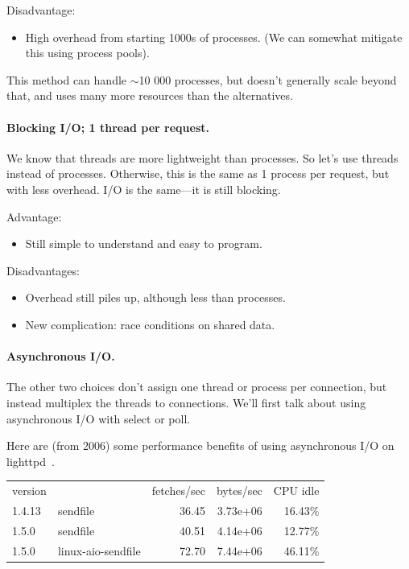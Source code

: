 \documentclass[a4paper]{report}
\begin{document}
Disadvantage:
  \begin{itemize}
    \item High overhead from starting 1000s of processes.
      (We can somewhat mitigate this using process pools).
  \end{itemize}
This method can handle $\sim$10 000 processes, but doesn't generally scale beyond that, and
uses many more resources than the alternatives.

\paragraph{Blocking I/O; 1 thread per request.}
    We know that threads are more lightweight than processes. So let's use threads instead
of processes. Otherwise, this is the same as 1 process per request, but with less overhead.
I/O is the same---it is still blocking.

    Advantage:
    \begin{itemize}
      \item Still simple to understand and easy to program.
    \end{itemize}

    Disadvantages:
    \begin{itemize}
      \item Overhead still piles up, although less than processes.
      \item New complication: race conditions on shared data.
    \end{itemize}

\paragraph{Asynchronous I/O.} The other two choices don't assign one thread or process per connection,
but instead multiplex the threads to connections. We'll first talk
about using asynchronous I/O with select or poll.  

Here are (from 2006) some performance benefits of using asynchronous
I/O on lighttpd~\cite{lttpd}.

    \begin{tabular}{llrrr}
    version & & fetches/sec & bytes/sec & CPU idle \\
    1.4.13 & sendfile & 36.45 & 3.73e+06 & 16.43\% \\
    1.5.0 & sendfile & 40.51 & 4.14e+06 & 12.77\% \\
    1.5.0 & linux-aio-sendfile & 72.70 & 7.44e+06 & 46.11\% \\
    \end{tabular}
\end{document}
